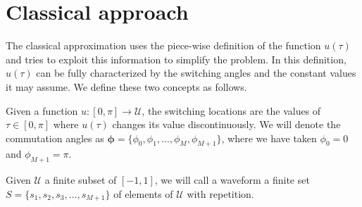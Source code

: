 \section{Classical approach}\label{Section2}

The classical approximation uses the piece-wise definition of the function $u(\tau)$ and tries to exploit this information to simplify the problem.  In this definition, $u(\tau)$ can be fully characterized by the switching angles and the constant values it may assume. We define these two concepts as follows.

\begin{definition}
Given a function $u:[0,\pi] \rightarrow \mathcal{U}$, the switching locations are the values of $\tau\in[0,\pi]$ where $u(\tau)$ changes its value discontinuously. We will denote the commutation angles as $\bm{\phi} = \{\phi_0,\phi_1,\dots,\phi_M,\phi_{M+1}\}$, where we have taken $\phi_0 = 0$ and $\phi_{M+1} = \pi$.
\end{definition}

\begin{definition}[Waveform]
Given $\mathcal U$ a finite subset of $[-1,1]$, we will call a waveform a finite set $S = \{s_1,s_2,s_3,\dots,s_{M+1}\}$ of elements of $\mathcal {U}$ with repetition.
\end{definition}

